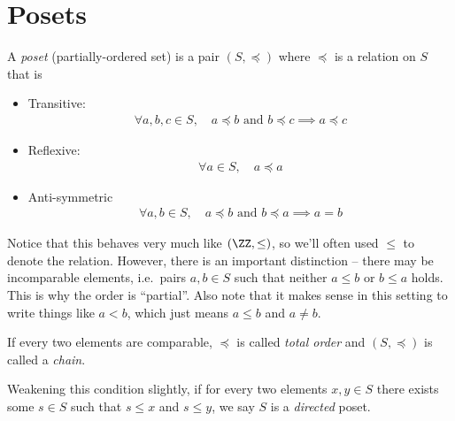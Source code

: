 \hypertarget{posets}{%
\section{Posets}\label{posets}}

\begin{definition}[Poset]

A \emph{poset} (partially-ordered set) is a pair \((S, \preceq)\) where
\(\preceq\) is a relation on \(S\) that is

\begin{itemize}
\tightlist
\item
  Transitive:
  \begin{align*}
  \forall a,b,c \in S,\quad a \preceq b \text{ and } b \preceq c \implies a \preceq c
  \end{align*}
\item
  Reflexive:
  \begin{align*}
  \forall a\in S,\quad a \preceq a
  \end{align*}
\item
  Anti-symmetric
  \begin{align*}
  \forall a,b\in S,\quad a \preceq b \text{ and } b \preceq a \implies a = b
  \end{align*}
\end{itemize}

\end{definition}

Notice that this behaves very much like \((\ZZ, \leq)\), so we'll often
used \(\leq\) to denote the relation. However, there is an important
distinction -- there may be incomparable elements, i.e.~pairs
\(a,b \in S\) such that neither \(a\leq b\) or \(b\leq a\) holds. This
is why the order is ``partial''. Also note that it makes sense in this
setting to write things like \(a< b\), which just means \(a\leq b\) and
\(a\neq b\).

\begin{definition}

If every two elements are comparable, \(\preceq\) is called \emph{total
order} and \((S, \preceq)\) is called a \emph{chain}.

\end{definition}

\begin{definition}

Weakening this condition slightly, if for every two elements
\(x,y\in S\) there exists some \(s\in S\) such that \(s\leq x\) and
\(s \leq y\), we say \(S\) is a \emph{directed} poset.

\end{definition}


